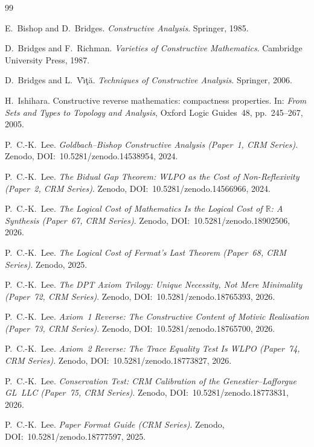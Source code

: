 \documentclass[12pt, a4paper]{article}
\theoremstyle{plain}
\theoremstyle{definition}
\theoremstyle{remark}
\begin{document}
\begin{thebibliography}{99}

E.~Bishop and D.~Bridges.
\textit{Constructive Analysis}.
Springer, 1985.

D.~Bridges and F.~Richman.
\textit{Varieties of Constructive Mathematics}.
Cambridge University Press, 1987.

D.~Bridges and L.~V\^{\i}\c{t}\u{a}.
\textit{Techniques of Constructive Analysis}.
Springer, 2006.

H.~Ishihara.
Constructive reverse mathematics: compactness properties.
In: \textit{From Sets and Types to Topology and Analysis},
Oxford Logic Guides~48, pp.~245--267, 2005.

P.~C.-K.~Lee.
\textit{Goldbach--Bishop Constructive Analysis
(Paper~1, CRM Series)}.
Zenodo, DOI:~10.5281/zenodo.14538954, 2024.

P.~C.-K.~Lee.
\textit{The Bidual Gap Theorem: WLPO as the Cost of Non-Reflexivity
(Paper~2, CRM Series)}.
Zenodo, DOI:~10.5281/zenodo.14566966, 2024.

P.~C.-K.~Lee.
\textit{The Logical Cost of Mathematics Is the Logical Cost of $\mathbb{R}$:
A Synthesis (Paper~67, CRM Series)}.
Zenodo, DOI:~10.5281/zenodo.18902506, 2026.

P.~C.-K.~Lee.
\textit{The Logical Cost of Fermat's Last Theorem
(Paper~68, CRM Series)}.
Zenodo, 2025.

P.~C.-K.~Lee.
\textit{The DPT Axiom Trilogy: Unique Necessity, Not Mere Minimality
(Paper~72, CRM Series)}.
Zenodo, DOI:~10.5281/zenodo.18765393, 2026.

P.~C.-K.~Lee.
\textit{Axiom~1 Reverse: The Constructive Content of
Motivic Realisation (Paper~73, CRM Series)}.
Zenodo, DOI:~10.5281/zenodo.18765700, 2026.

P.~C.-K.~Lee.
\textit{Axiom~2 Reverse: The Trace Equality Test Is WLPO
(Paper~74, CRM Series)}.
Zenodo, DOI:~10.5281/zenodo.18773827, 2026.

P.~C.-K.~Lee.
\textit{Conservation Test: CRM Calibration of the
Genestier--Lafforgue GL~LLC (Paper~75, CRM Series)}.
Zenodo, DOI:~10.5281/zenodo.18773831, 2026.

P.~C.-K.~Lee.
\textit{Paper Format Guide (CRM Series)}.
Zenodo, DOI:~10.5281/zenodo.18777597, 2025.


\end{thebibliography}
\end{document}
